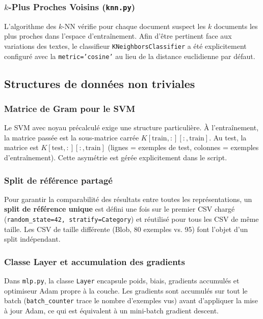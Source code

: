 \documentclass[12pt,a4paper]{article}
\begin{document}
\subsubsection{$k$-Plus Proches Voisins (\texttt{knn.py})}
L'algorithme des $k$-NN vérifie pour chaque document suspect les $k$ documents les plus proches dans l'espace d'entraînement. Afin d'être pertinent face aux variations des textes, le classifieur \texttt{KNeighborsClassifier} a été explicitement configuré avec la \texttt{metric='cosine'} au lieu de la distance euclidienne par défaut.

\subsection{Structures de données non triviales}

\subsubsection{Matrice de Gram pour le SVM}
Le SVM avec noyau précalculé exige une structure particulière. À l'entraînement, la matrice passée est la sous-matrice carrée $K[\text{train},:][:,\text{train}]$. Au test, la matrice est $K[\text{test},:][:,\text{train}]$ (lignes = exemples de test, colonnes = exemples d'entraînement). Cette asymétrie est gérée explicitement dans le script.

\subsubsection{Split de référence partagé}
Pour garantir la comparabilité des résultats entre toutes les représentations, un \textbf{split de référence unique} est défini une fois sur le premier CSV chargé (\texttt{random\_state=42, stratify=Category}) et réutilisé pour tous les CSV de même taille. Les CSV de taille différente (Blob, 80 exemples vs. 95) font l'objet d'un split indépendant.

\subsubsection{Classe Layer et accumulation des gradients}
Dans \texttt{mlp.py}, la classe \texttt{Layer} encapsule poids, biais, gradients accumulés et optimiseur Adam propre à la couche. Les gradients sont accumulés sur tout le batch (\texttt{batch\_counter} trace le nombre d'exemples vus) avant d'appliquer la mise à jour Adam, ce qui est équivalent à un mini-batch gradient descent.
\end{document}
